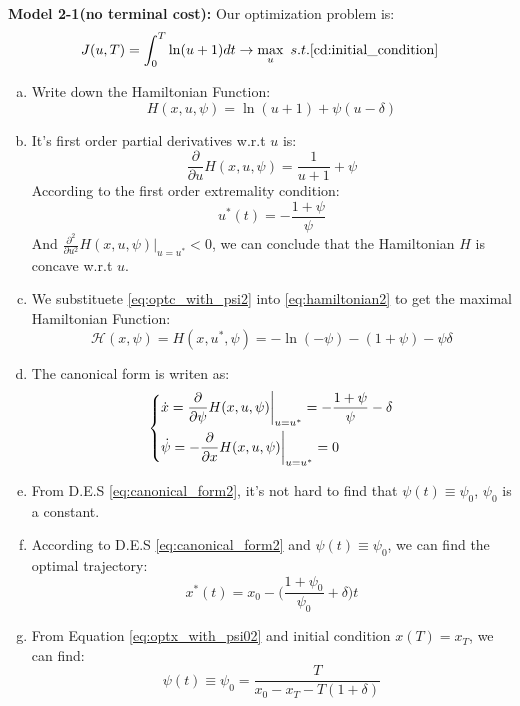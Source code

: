 {\bf Model 2-1(no terminal cost):} Our optimization problem is:
\begin{equation}
    J(u,T)=\int_{0}^{T}\ln(u+1)dt\rightarrow \max_{u}\ s.t. \eqref{cd:initial_condition}
\end{equation}
\begin{enumerate}[a)]
    \item Write down the Hamiltonian Function:
            \begin{equation}\label{eq:hamiltonian2}
                H(x,u,\psi)=\ln(u+1)+\psi (u-\delta)
            \end{equation}
    \item It's first order partial derivatives w.r.t $u$ is:
            \begin{equation}
                \frac{\partial }{\partial u}H(x,u,\psi)=\frac{1}{u+1}+\psi
            \end{equation}
             According to the first order extremality condition:
             \begin{equation}\label{eq:optc_with_psi2}
                u^*(t)=-\frac{1+\psi}{\psi}
             \end{equation}
             And $\frac{\partial^2 }{\partial u^2}H(x,u,\psi)\big|_{u=u^*}<0$, we can conclude that the Hamiltonian $H$ is concave w.r.t $u$.
    \item We substituete \eqref{eq:optc_with_psi2} into \eqref{eq:hamiltonian2} to get the maximal Hamiltonian Function:
             \begin{equation}
                \mathcal{H}(x, \psi)=H(x,u^*,\psi)=-\ln(-\psi)-(1+\psi)-\psi\delta
             \end{equation}
    \item The canonical form is writen as:
             \begin{equation}\label{eq:canonical_form2}
                 \begin{dcases}
                    \dot{x}= \frac{\partial }{\partial \psi}H(x,u,\psi)\bigg|_{u=u^*}=-\frac{1+\psi}{\psi}-\delta\\
                    \dot{\psi}=-\frac{\partial }{\partial x}H(x,u,\psi)\bigg|_{u=u^*}=0
                \end{dcases}
             \end{equation}
    \item From D.E.S \eqref{eq:canonical_form2}, it's not hard to find that $\psi(t)\equiv \psi_0$, $\psi_0$ is a constant.

    \item According to D.E.S \eqref{eq:canonical_form2} and $\psi(t)\equiv \psi_0$, we can find the optimal trajectory:
             \begin{equation}\label{eq:optx_with_psi02}
                 x^*(t)=x_0-\bigg(\frac{1+\psi_0}{\psi_0}+\delta\bigg)t
             \end{equation}
    \item From Equation \eqref{eq:optx_with_psi02} and initial condition $x(T)=x_T$, we can find:
             \begin{equation}
                \psi(t)\equiv\psi_0=\frac{T}{x_0-x_T-T(1+\delta)} \label{eq:psi2}
             \end{equation}


\end{enumerate}

